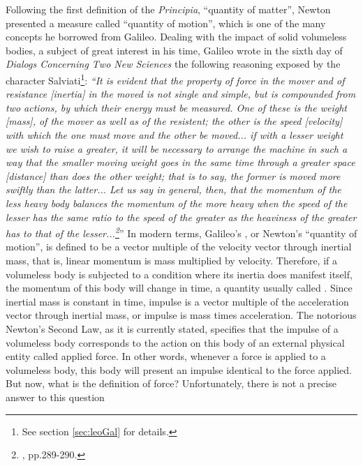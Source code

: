 Following the first definition of the \emph{Principia}, ``quantity of matter'', Newton presented a measure called ``quantity of motion'', which is one of the many concepts he borrowed from Galileo. Dealing with the impact of solid volumeless bodies, a subject of great interest in his time, Galileo wrote in the sixth day of \emph{Dialogs Concerning Two New Sciences} the following reasoning exposed by the character Salviati\footnote{See section \ref{sec:leoGal} for details.}: \emph{``It is evident that the property of force in the mover and of resistance [inertia] in the moved is not single and simple, but is compounded from two actions, by which their energy must be measured. One of these is the weight \emph{[mass]}, of the mover as well as of the resistent; the other is the speed \emph{[velocity]} with which the one must move and the other be moved... if with a lesser weight we wish to raise a greater, it will be necessary to arrange the machine in such a way that the smaller moving weight goes in the same time through a greater space \emph{[distance]} than does the other weight; that is to say, the former is moved more swiftly than the latter... Let us say in general, then, that the momentum of the less heavy body balances the momentum of the more heavy when the speed of the lesser has the same ratio to the speed of the greater as the heaviness of the greater has to that of the lesser...\footnote{\cite{galileo_1989_1}, pp.289-290.}}'' In modern terms, Galileo's , or Newton's ``quantity of motion'', is defined to be a vector multiple of the velocity vector through inertial mass, that is, linear momentum is mass multiplied by velocity. Therefore, if a volumeless body is subjected to a condition where its inertia does manifest itself, the momentum of this body will change in time, a quantity usually called . Since inertial mass is constant in time, impulse is a vector multiple of the acceleration vector through inertial mass, or impulse is mass times acceleration. The notorious Newton's Second Law, as it is currently stated, specifies that the impulse of a volumeless body corresponds to the action on this body of an external physical entity called applied force. In other words, whenever a force is applied to a volumeless body, this body will present an impulse identical to the force applied. But now, what is the definition of force?  Unfortunately, there is not a precise answer to this question

     
